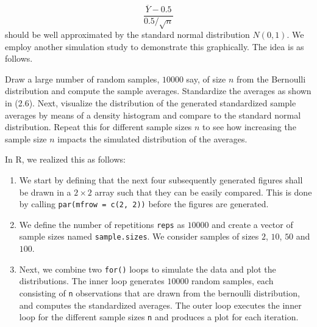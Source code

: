 \documentclass[]{book}
\theoremstyle{definition}
\theoremstyle{definition}
\theoremstyle{definition}
\theoremstyle{remark}
\begin{document}
\[ \frac{\overline{Y} - 0.5}{0.5/\sqrt{n}} \tag{2.6}\] should be well
approximated by the standard normal distribution \(N(0,1)\). We employ
another simulation study to demonstrate this graphically. The idea is as
follows.

Draw a large number of random samples, \(10000\) say, of size \(n\) from
the Bernoulli distribution and compute the sample averages. Standardize
the averages as shown in (2.6). Next, visualize the distribution of the
generated standardized sample averages by means of a density histogram
and compare to the standard normal distribution. Repeat this for
different sample sizes \(n\) to see how increasing the sample size \(n\)
impacts the simulated distribution of the averages.

In R, we realized this as follows:

\begin{enumerate}
\def\labelenumi{\arabic{enumi}.}
\item
  We start by defining that the next four subsequently generated figures
  shall be drawn in a \(2\times2\) array such that they can be easily
  compared. This is done by calling \texttt{par(mfrow\ =\ c(2,\ 2))}
  before the figures are generated.
\item
  We define the number of repetitions \texttt{reps} as \(10000\) and
  create a vector of sample sizes named \texttt{sample.sizes}. We
  consider samples of sizes \(2\), \(10\), \(50\) and \(100\).
\item
  Next, we combine two \texttt{for()} loops to simulate the data and
  plot the distributions. The inner loop generates \(10000\) random
  samples, each consisting of \texttt{n} observations that are drawn
  from the bernoulli distribution, and computes the standardized
  averages. The outer loop executes the inner loop for the different
  sample sizes \texttt{n} and produces a plot for each iteration.
\end{enumerate}
\end{document}
